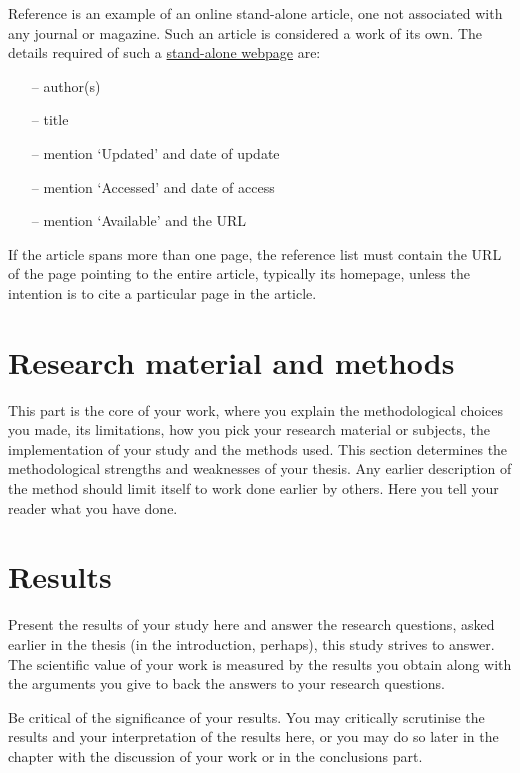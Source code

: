 \documentclass[english, 12pt, a4paper, elec, utf8, a-2b, online]{aaltothesis}
\begin{document}
\noindent
Reference \cite{webpage} is an example of an online stand-alone article, one not
associated with any journal or magazine. Such an article is considered a work of
its own. The details required of such a \underline{stand-alone webpage} 
are:
\begin{itemize}
\setlength{\itemsep}{-3pt}
\item[--] author(s)
\item[--] title
\item[--] mention `Updated' and date of update
\item[--] mention `Accessed' and date of access
\item[--] mention `Available' and the URL
\end{itemize}
If the article spans more than one page, the reference list must contain the URL
of the page pointing to the entire article, typically its homepage, unless the 
intention is to cite a particular page in the article.


\clearpage

\section{Research material and methods}

This part is the core of your work, where you explain the methodological choices
you made, its limitations, how you pick your research material or subjects, the 
implementation of your study and the methods used. This section determines the 
methodological strengths and weaknesses of your thesis. Any earlier description 
of the method should limit itself to work done earlier by others. Here you tell 
your reader what you have done.

\clearpage

\section{Results}

Present the results of your study here and answer the research questions, asked 
earlier in the thesis (in the introduction, perhaps), this study strives to 
answer. The scientific value of your work is measured by the results you obtain 
along with the arguments you give to back the answers to your research 
questions.

Be critical of the significance of your results. You may critically scrutinise 
the results and your interpretation of the results here, or you may do so later 
in the chapter with the discussion of your work or in the conclusions part.
\end{document}
